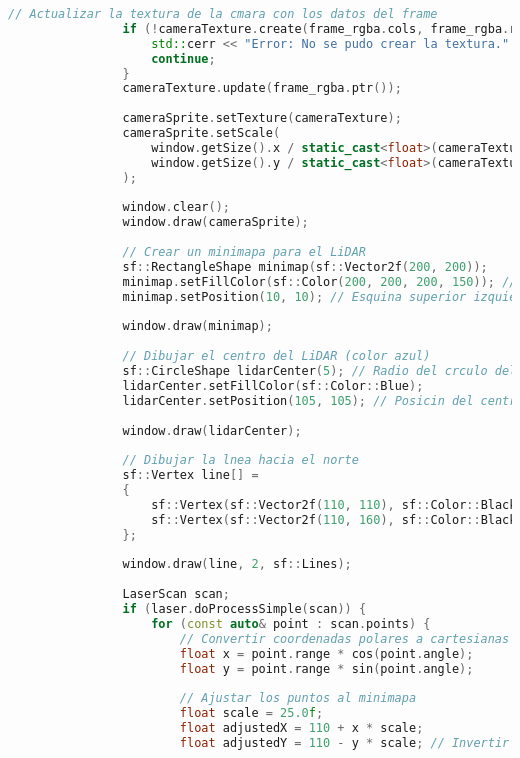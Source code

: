 \begin{lstlisting}[language={C++}, caption={Primer ajuste de c\'odigo}, label={Script}]
                // Actualizar la textura de la cmara con los datos del frame
                if (!cameraTexture.create(frame_rgba.cols, frame_rgba.rows)) {
                    std::cerr << "Error: No se pudo crear la textura." << std::endl;
                    continue;
                }
                cameraTexture.update(frame_rgba.ptr());
        
                cameraSprite.setTexture(cameraTexture);
                cameraSprite.setScale(
                    window.getSize().x / static_cast<float>(cameraTexture.getSize().x),
                    window.getSize().y / static_cast<float>(cameraTexture.getSize().y)
                );
        
                window.clear();
                window.draw(cameraSprite);
        
                // Crear un minimapa para el LiDAR
                sf::RectangleShape minimap(sf::Vector2f(200, 200));
                minimap.setFillColor(sf::Color(200, 200, 200, 150)); // Fondo semitransparente
                minimap.setPosition(10, 10); // Esquina superior izquierda
        
                window.draw(minimap);
        
                // Dibujar el centro del LiDAR (color azul)
                sf::CircleShape lidarCenter(5); // Radio del crculo del LiDAR
                lidarCenter.setFillColor(sf::Color::Blue);
                lidarCenter.setPosition(105, 105); // Posicin del centro en el minimapa
        
                window.draw(lidarCenter);
        
                // Dibujar la lnea hacia el norte
                sf::Vertex line[] =
                {
                    sf::Vertex(sf::Vector2f(110, 110), sf::Color::Black),
                    sf::Vertex(sf::Vector2f(110, 160), sf::Color::Black) // Lnea hacia arriba (norte)
                };
        
                window.draw(line, 2, sf::Lines);
        
                LaserScan scan;
                if (laser.doProcessSimple(scan)) {
                    for (const auto& point : scan.points) {
                        // Convertir coordenadas polares a cartesianas
                        float x = point.range * cos(point.angle);
                        float y = point.range * sin(point.angle);
        
                        // Ajustar los puntos al minimapa
                        float scale = 25.0f;
                        float adjustedX = 110 + x * scale;
                        float adjustedY = 110 - y * scale; // Invertir Y para coordinar con la pantalla
        

\end{lstlisting}
